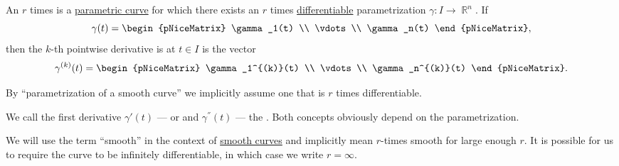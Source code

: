 \begin{definition}\label{def:smooth_curve}
  An \( r \) times  is a \hyperref[def:parametric_curve]{parametric curve} for which there exists an \( r \) times \hyperref[def:differentiability/frechet]{differentiable} parametrization \( \gamma: I \to \BbbR^n \). If
  \begin{equation*}
    \gamma(t) = \begin{pNiceMatrix}
      \gamma_1(t) \\
      \vdots \\
      \gamma_n(t)
    \end{pNiceMatrix},
  \end{equation*}
  then the \( k \)-th pointwise derivative is at \( t \in I \) is the vector
  \begin{equation*}
    \gamma^{(k)}(t) = \begin{pNiceMatrix}
      \gamma_1^{(k)}(t) \\
      \vdots \\
      \gamma_n^{(k)}(t)
    \end{pNiceMatrix}.
  \end{equation*}

  By \enquote{parametrization of a smooth curve} we implicitly assume one that is \( r \) times differentiable.

  We call the first derivative \( \gamma'(t) \) ---  or  and \( \gamma^\dprime(t) \) --- the . Both concepts obviously depend on the parametrization.
\end{definition}

\begin{remark}\label{rem:smooth_curve}
  We will use the term \enquote{smooth} in the context of \hyperref[def:smooth_curve]{smooth curves} and implicitly mean \( r \)-times smooth for large enough \( r \). It is possible for us to require the curve to be infinitely differentiable, in which case we write \( r = \infty \).
\end{remark}

